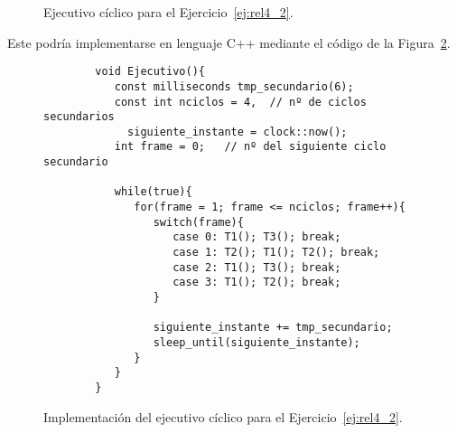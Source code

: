 \begin{ejercicio}
\begin{figure}[H]
        \caption{Ejecutivo cíclico para el Ejercicio~\ref{ej:rel4_2}.}
        \label{fig:ej2}
    \end{figure}
    Este podría implementarse en lenguaje C++ mediante el código de la Figura~\ref{cod:ej2}.
    \begin{figure}
    \centering
    \begin{verbatim}
        void Ejecutivo(){
           const milliseconds tmp_secundario(6);
           const int nciclos = 4,  // nº de ciclos secundarios
             siguiente_instante = clock::now();  
           int frame = 0;   // nº del siguiente ciclo secundario

           while(true){
              for(frame = 1; frame <= nciclos; frame++){
                 switch(frame){
                    case 0: T1(); T3(); break;
                    case 1: T2(); T1(); T2(); break;
                    case 2: T1(); T3(); break;
                    case 3: T1(); T2(); break;
                 }

                 siguiente_instante += tmp_secundario;
                 sleep_until(siguiente_instante);
              }
           }
        }
    \end{verbatim}
    \caption{Implementación del ejecutivo cíclico para el Ejercicio~\ref{ej:rel4_2}.}
    \label{cod:ej2}
    \end{figure}

\end{ejercicio}

